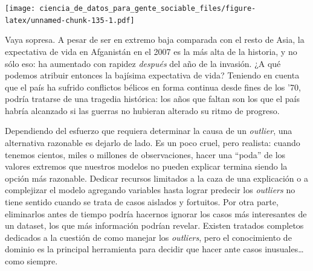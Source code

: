 \documentclass[spanish,]{book}
\newenvironment{Shaded}{\begin{snugshade}}{\end{snugshade}}
\newcommand{\DataTypeTok}[1]{\textcolor[rgb]{0.13,0.29,0.53}{#1}}
\newcommand{\KeywordTok}[1]{\textcolor[rgb]{0.13,0.29,0.53}{\textbf{#1}}}
\newcommand{\NormalTok}[1]{#1}
\newcommand{\OperatorTok}[1]{\textcolor[rgb]{0.81,0.36,0.00}{\textbf{#1}}}
\newcommand{\StringTok}[1]{\textcolor[rgb]{0.31,0.60,0.02}{#1}}
\begin{document}
\begin{Shaded}
\end{Shaded}

\texttt{[image: ciencia\_de\_datos\_para\_gente\_sociable\_files/figure-latex/unnamed-chunk-135-1.pdf]}

Vaya sopresa. A pesar de ser en extremo baja comparada con el resto de Asia, la expectativa de vida en Afganistán en el 2007 es la más alta de la historia, y no sólo eso: ha aumentado con rapidez \emph{después} del año de la invasión. ¿A qué podemos atribuir entonces la bajísima expectativa de vida? Teniendo en cuenta que el país ha sufrido conflictos bélicos en forma continua desde fines de los '70, podría tratarse de una tragedia histórica: los años que faltan son los que el país habría alcanzado si las guerras no hubieran alterado su ritmo de progreso.

Dependiendo del esfuerzo que requiera determinar la causa de un \emph{outlier}, una alternativa razonable es dejarlo de lado. Es un poco cruel, pero realista: cuando tenemos cientos, miles o millones de observaciones, hacer una ``poda'' de los valores extremos que nuestros modelos no pueden explicar termina siendo la opción más razonable. Dedicar recursos limitados a la caza de una explicación o a complejizar el modelo agregando variables hasta lograr predecir los \emph{outliers} no tiene sentido cuando se trata de casos aislados y fortuitos. Por otra parte, eliminarlos antes de tiempo podría hacernos ignorar los casos más interesantes de un dataset, los que más información podrían revelar. Existen tratados completos dedicados a la cuestión de como manejar los \emph{outliers}, pero el conocimiento de dominio es la principal herramienta para decidir que hacer ante casos inusuales\ldots{} como siempre.
\end{document}
